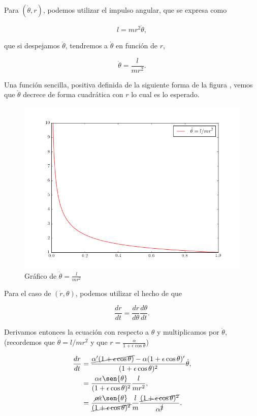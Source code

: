\documentclass[a4paper,10pt]{article}
\numberwithin{equation}{section}
\begin{document}
Para $(\dot{\theta},r)$, podemos utilizar el impulso angular, que se expresa como

\begin{equation}
 l = mr^2\dot{\theta},
\end{equation}

que si despejamos $\dot{\theta}$, tendremos a $\dot{\theta}$ en función de $r$,

\begin{equation}
 \dot{\theta} = \frac{l}{mr^2}.
\end{equation}

Una función sencilla, positiva definida de la siguiente forma de la figura ,
vemos que $\dot{\theta}$ decrece de forma cuadrática con $r$ lo cual es lo esperado.

\begin{figure}[H]
 \center 
 \includegraphics[scale=0.5]{problema5fig5}
 \caption{Gráfico de  $\dot{\theta} = \frac{l}{mr^2}$}
 \label{fig:titaDotR}
\end{figure}

Para el caso de $(\dot{r},\theta)$, podemos utilizar el hecho de que 

\begin{equation}
 \frac{dr}{dt} = \frac{dr}{d\theta}\frac{d\theta}{dt}.
\end{equation}

Derivamos entonces la ecuación  con respecto a $\theta$ y multiplicamos 
por $\dot{\theta}$, (recordemos que $\dot{\theta} = l/mr^2$ y que $r=\frac{\alpha}{1+\epsilon\cos{\theta}}$)

\begin{align}
 \begin{split}
  \frac{dr}{dt} &= \frac{\cancel{\alpha'(1+\epsilon \cos{\theta})}-\alpha(1+\epsilon 
  \cos{\theta})'}{(1+\epsilon\cos{\theta})^2} \dot{\theta}, \\
		&= \frac{\alpha\epsilon \sen{\theta}}{(1+\epsilon\cos{\theta})^2} 
		\frac{l}{mr^2}, \\
		&= \frac{\cancel{\alpha}\epsilon\sen{\theta}}{\cancel{(1+\epsilon\cos{\theta})^2}}
		\frac{l}{m}\frac{\cancel{(1+\epsilon\cos{\theta})^2}}{\alpha^{\cancel{2}}}.
 \end{split}
\end{align}
\end{document}
